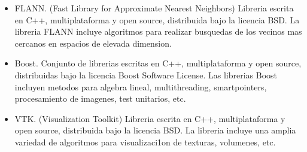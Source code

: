\begin{itemize}
\item FLANN. (Fast Library for Approximate Nearest Neighbors) Libreria escrita en C++, multiplataforma y open source, distribuida bajo la licencia BSD. La libreria FLANN incluye algoritmos para realizar busquedas de los vecinos mas cercanos en espacios de elevada dimension.

\item Boost. Conjunto de librerias escritas en C++, multiplataforma y open source, distribuidas bajo la licencia Boost Software License. Las librerias Boost incluyen metodos para algebra lineal, multithreading, smartpointers, procesamiento de imagenes, test unitarios, etc.

\item VTK. (Visualization Toolkit) Libreria escrita en C++, multiplataforma y open source, distribuida bajo la licencia BSD. La libreria incluye una amplia variedad de algoritmos para visualizaci1on de texturas, volumenes, etc.

\end{itemize}

